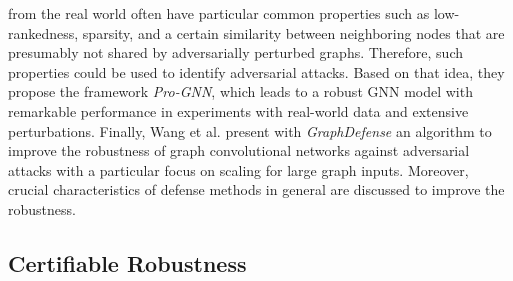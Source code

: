 \documentclass[a4paper,preprint]{sig-alternate}
\begin{document}
from the real world often have particular common properties such as low-rankedness, sparsity, and a certain similarity between neighboring
nodes that are presumably not shared by adversarially perturbed graphs. Therefore, such properties could be used to identify adversarial attacks.
Based on that idea, they propose the framework \textit{Pro-GNN}, which leads to a robust GNN model with remarkable performance in experiments
with real-world data and extensive perturbations.
Finally, Wang et al. \cite{Wang_2019} present with \textit{GraphDefense} an algorithm to improve the robustness of graph convolutional 
networks against adversarial attacks with a particular focus on scaling for large graph inputs. 
Moreover, crucial characteristics of defense methods in general are discussed to improve the robustness.

\subsection{Certifiable Robustness}
\label{sec:rev3}
\end{document}
